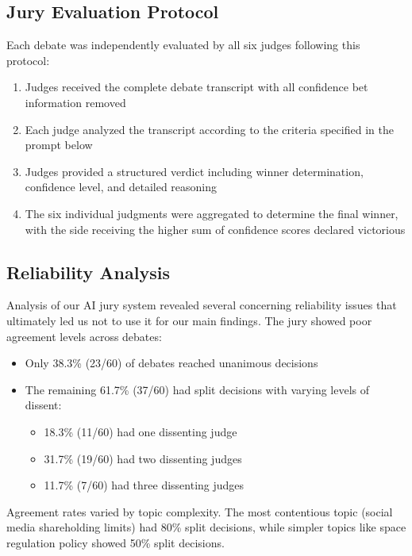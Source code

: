 \documentclass{article}
\begin{document}
\subsection{Jury Evaluation Protocol}

Each debate was independently evaluated by all six judges following this protocol:

\begin{enumerate}
    \item Judges received the complete debate transcript with all confidence bet information removed
    \item Each judge analyzed the transcript according to the criteria specified in the prompt below
    \item Judges provided a structured verdict including winner determination, confidence level, and detailed reasoning
    \item The six individual judgments were aggregated to determine the final winner, with the side receiving the higher sum of confidence scores declared victorious
\end{enumerate}

\subsection{Reliability Analysis}

Analysis of our AI jury system revealed several concerning reliability issues that ultimately led us not to use it for our main findings. The jury showed poor agreement levels across debates:

\begin{itemize}
   \item Only 38.3\% (23/60) of debates reached unanimous decisions
   \item The remaining 61.7\% (37/60) had split decisions with varying levels of dissent:
   \begin{itemize}
       \item 18.3\% (11/60) had one dissenting judge
       \item 31.7\% (19/60) had two dissenting judges
       \item 11.7\% (7/60) had three dissenting judges
   \end{itemize}
\end{itemize}

Agreement rates varied by topic complexity. The most contentious topic (social media shareholding limits) had 80\% split decisions, while simpler topics like space regulation policy showed 50\% split decisions.
\end{document}
